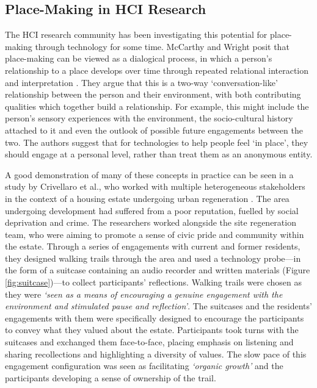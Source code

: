 \subsection{Place-Making in HCI Research}
\label{sec:PlaceMakingHCI}

The HCI research community has been investigating this potential for place-making through technology for some time. McCarthy and Wright posit that place-making can be viewed as a dialogical process, in which a person's relationship to a place develops over time through repeated relational interaction and interpretation \citep{McCarthy2005}. They argue that this is a two-way `conversation-like' relationship between the person and their environment, with both contributing qualities which together build a relationship. For example, this might include the person's sensory experiences with the environment, the socio-cultural history attached to it and even the outlook of possible future engagements between the two. The authors suggest that for technologies to help people feel `in place', they should engage at a personal level, rather than treat them as an anonymous entity. 

A good demonstration of many of these concepts in practice can be seen in a study by Crivellaro et al., who worked with multiple heterogeneous stakeholders in the context of a housing estate undergoing urban regeneration \citep{Crivellaro2016}. The area undergoing development had suffered from a poor reputation, fuelled by social deprivation and crime. The researchers worked alongside the site regeneration team, who were aiming to promote a sense of civic pride and community within the estate. Through a series of engagements with current and former residents, they designed walking trails through the area and used a technology probe---in the form of a suitcase containing an audio recorder and written materials (Figure \ref{fig:suitcase})---to collect participants' reflections. Walking trails were chosen as they were \textit{`seen as a means of encouraging a genuine engagement with the environment and stimulated pause and reflection'}. The suitcases and the residents' engagements with them were specifically designed to encourage the participants to convey what they valued about the estate. Participants took turns with the suitcases and exchanged them face-to-face, placing emphasis on listening and sharing recollections and highlighting a diversity of values. The slow pace of this engagement configuration was seen as facilitating \textit{`organic growth'} and the participants developing a sense of ownership of the trail. 


